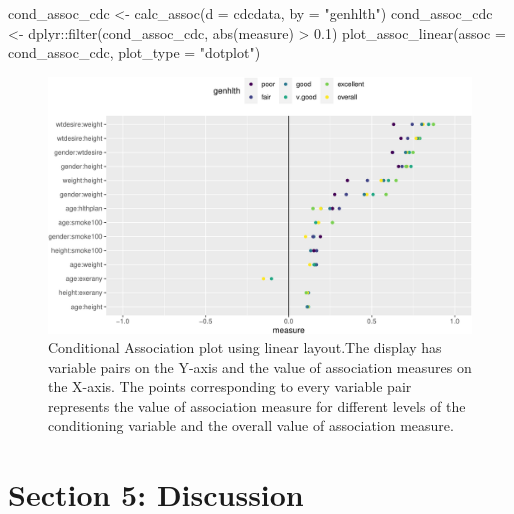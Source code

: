 \begin{Schunk}
\begin{Sinput}
cond_assoc_cdc <- calc_assoc(d = cdcdata, 
                             by = "genhlth")
cond_assoc_cdc <- dplyr::filter(cond_assoc_cdc, abs(measure) > 0.1)
plot_assoc_linear(assoc = cond_assoc_cdc,
                  plot_type = "dotplot")
\end{Sinput}
\begin{figure}

{\centering \includegraphics{rj_paper_files/figure-latex/linear-cond-assoc-1} 

}

\caption[Conditional Association plot using linear layout.The display has variable pairs on the Y-axis and the value of association measures on the X-axis]{Conditional Association plot using linear layout.The display has variable pairs on the Y-axis and the value of association measures on the X-axis. The points corresponding to every variable pair represents the value of association measure for different levels of the conditioning variable and the overall value of association measure.}\label{fig:linear-cond-assoc}
\end{figure}
\end{Schunk}

\hypertarget{section-5-discussion}{%
\section{Section 5: Discussion}\label{section-5-discussion}}

